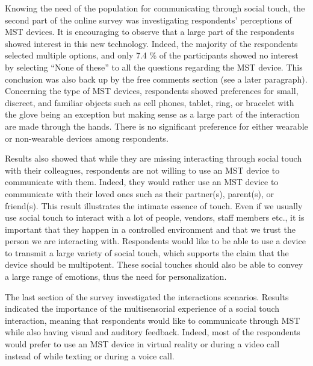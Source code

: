 \documentclass[acmsmall]{acmart}
\begin{document}
Knowing the need of the population for communicating through social touch, the second part of the online survey was investigating respondents’ perceptions of MST devices. It is encouraging to observe that a large part of the respondents showed interest in this new technology. Indeed, the majority of the respondents selected multiple options, and only 7.4 \% of the participants showed no interest by selecting “None of these” to all the questions regarding the MST device. This conclusion was also back up by the free comments section (see a later paragraph). Concerning the type of MST devices, respondents showed preferences for small, discreet, and familiar objects such as cell phones, tablet, ring, or bracelet with the glove being an exception but making sense as a large part of the interaction are made through the hands. There is no significant preference for either wearable or non-wearable devices among respondents. %

Results also showed that while they are missing interacting through social touch with their colleagues, respondents are not willing to use an MST device to communicate with them. Indeed, they would rather use an MST device to communicate with their loved ones such as their partner(s), parent(s), or friend(s). This result illustrates the intimate essence of touch. Even if we usually use social touch to interact with a lot of people, vendors, staff members etc., it is important that they happen in a controlled environment and that we trust the person we are interacting with.
Respondents would like to be able to use a device to transmit a large variety of social touch, which supports the claim that the device should be multipotent. These social touches should also be able to convey a large range of emotions, thus the need for personalization.

The last section of the survey investigated the interactions scenarios. Results indicated the importance of the multisensorial experience of a social touch interaction, meaning that respondents would like to communicate through MST while also having visual and auditory feedback. Indeed, most of the respondents would prefer to use an MST device in virtual reality or during a video call instead of while texting or during a voice call.
\end{document}
